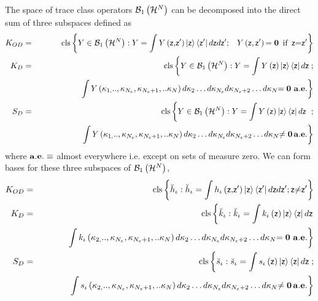 The space of trace class operators ${\cal B}_{1}\left( {\cal H}^{N}\right) $
can be decomposed into the direct sum of three subspaces defined as%
\begin{eqnarray}
K_{OD} &=&{\rm cls}\left\{ Y\in {\cal B}_{1}\left( {\cal H}^{N}\right)
:Y=\int Y\left( {\sf z}{\bf ,}{\sf z}^{\prime }\right) \left| {\sf z}%
\right\rangle \left\langle {\sf z}^{\prime }\right| d{\sf z}d{\sf z}^{\prime
}{\bf ;\quad }Y\left( {\sf z},{\sf z}^{\prime }\right) {\bf =0}\text{%
\thinspace\ if }\,{\sf z}{\bf =}{\sf z}^{\prime }\right\} \\
K_{D} &=&{\rm cls}\left\{ Y\in {\cal B}_{1}\left( {\cal H}^{N}\right)
:Y=\int Y\left( {\sf z}\right) \left| {\sf z}\right\rangle \left\langle {\sf %
z}\right| d{\sf z}\right. ;  \nonumber \\
&&\left. \qquad \qquad \quad \int Y\left( \kappa _{1,}..,\kappa
_{N_{e}},\kappa _{N_{e}+1},..\kappa _{N}\right) d\kappa _{2}\ldots d\kappa
_{N_{e}}d\kappa _{N_{e}+2}\ldots d\kappa _{N}{\bf =0}\text{ }{\bf a.e.}%
\right\} \\
S_{D} &=&{\rm cls}\left\{ Y\in {\cal B}_{1}\left( {\cal H}^{N}\right)
:Y=\int Y\left( {\sf z}\right) \left| {\sf z}\right\rangle \left\langle {\sf %
z}\right| d{\sf z}\right. \text{ };  \nonumber \\
&&\left. \qquad \qquad \quad \int Y\left( \kappa _{1,}..,\kappa
_{N_{e}},\kappa _{N_{e}+1},..\kappa _{N}\right) d\kappa _{2}\ldots d\kappa
_{N_{e}}d\kappa _{N_{e}+2}\ldots d\kappa _{N}{\bf \neq 0\,a.e.}\right\}
\end{eqnarray}%
where ${\bf a.e.\equiv }$ almost everywhere i.e. except on sets of measure
zero. We can form bases for these three subspaces of ${\cal B}_{1}\left( 
{\cal H}^{N}\right) $,%
\begin{eqnarray}
K_{OD} &=&{\rm cls}\left\{ \breve{h}_{\iota }:\breve{h}_{\iota }=\int
h_{\iota }\left( {\sf z}{\bf ,}{\sf z}^{\prime }\right) \left| {\sf z}%
\right\rangle \left\langle {\sf z}^{\prime }\right| d{\sf z}d{\sf z}^{\prime
};{\sf z}{\bf \neq }{\sf z}^{\prime }\right\}  \label{hbasis} \\
K_{D} &=&{\rm cls}\left\{ \breve{k}_{\iota }:\breve{k}_{\iota }=\int
k_{\iota }\left( {\sf z}\right) \left| {\sf z}\right\rangle \left\langle 
{\sf z}\right| d{\sf z}\right.  \nonumber \\
&&\quad \quad \quad \left. \int k_{\iota }\left( \kappa _{2,}..,\kappa
_{N_{e}},\kappa _{N_{e}+1},..\kappa _{N}\right) d\kappa _{2}\ldots d\kappa
_{N_{e}}d\kappa _{N_{e}+2}\ldots d\kappa _{N}{\bf =0}\text{ }{\bf a.e.}%
\right\}  \label{kbasis} \\
S_{D} &=&{\rm cls}\left\{ \breve{s}_{\iota }:\breve{s}_{\iota }=\int
s_{\iota }\left( {\sf z}\right) \left| {\sf z}\right\rangle \left\langle 
{\sf z}\right| d{\sf z}\right. ;  \nonumber \\
&&\quad \left. \qquad \int s_{\iota }\left( \kappa _{2,}..,\kappa
_{N_{e}},\kappa _{N_{e}+1},..\kappa _{N}\right) d\kappa _{2}\ldots d\kappa
_{N_{e}}d\kappa _{N_{e}+2}\ldots d\kappa _{N}{\bf \neq 0\,a.e.}\right\}
\label{sbasis}
\end{eqnarray}


